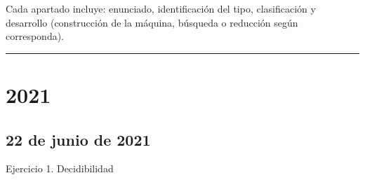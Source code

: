 \documentclass[12pt]{book} %
\begin{document}
Cada apartado incluye: enunciado, identificación del tipo, clasificación
y desarrollo (construcción de la máquina, búsqueda o reducción según
corresponda).

\begin{center}\rule{0.5\linewidth}{0.5pt}\end{center}

\hypertarget{section}{%
\section{2021}\label{section}}

\hypertarget{de-junio-de-2021}{%
\subsection{22 de junio de 2021}\label{de-junio-de-2021}}

Ejercicio 1. Decidibilidad
\end{document}

